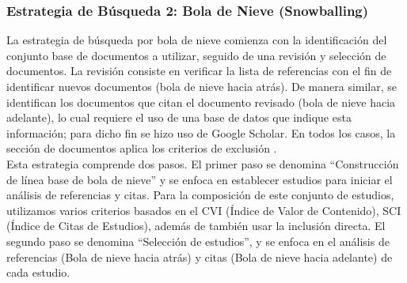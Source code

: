 \subsubsection{Estrategia de Búsqueda 2: Bola de Nieve (Snowballing)}

\newcommand{\csiSelected}{24} %
\newcommand{\newSnowballStudies}{3} %
\newcommand{\firstBackwardSnowballStudies}{3} %
\newcommand{\firstForwardSnowballStudies}{4} %
\newcommand{\secondBackwardSnowballStudies}{3} %
\newcommand{\secondForwardSnowballStudies}{5} %

\newcommand{\firstSnowballIterationStudies}{\fpeval{\firstBackwardSnowballStudies+\firstForwardSnowballStudies}}
\newcommand{\secondSnowballIterationStudies}{\fpeval{\secondBackwardSnowballStudies+\secondForwardSnowballStudies}}

\newcommand{\snowballNewStudies}{\fpeval{\firstSnowballIterationStudies+\secondSnowballIterationStudies}}

La estrategia de búsqueda por bola de nieve comienza con la identificación del conjunto base de documentos a utilizar, seguido de una revisión y selección de documentos. La revisión consiste en verificar la lista de referencias con el fin de identificar nuevos documentos (bola de nieve hacia atrás). De manera similar, se identifican los documentos que citan el documento revisado (bola de nieve hacia adelante), lo cual requiere el uso de una base de datos que indique esta información; para dicho fin se hizo uso de Google Scholar. En todos los casos, la sección de documentos aplica los criterios de exclusión \cite{Wohlin-01}.
\\
Esta estrategia comprende dos pasos. El primer paso se denomina ``Construcción de línea base de bola de nieve'' y se enfoca en establecer estudios para iniciar el análisis de referencias y citas. Para la composición de este conjunto de estudios, utilizamos varios criterios basados en el CVI (Índice de Valor de Contenido), SCI (Índice de Citas de Estudios), además de también usar la inclusión directa. El segundo paso se denomina ``Selección de estudios'', y se enfoca en el análisis de referencias (Bola de nieve hacia atrás) y citas (Bola de nieve hacia adelante) de cada estudio.


